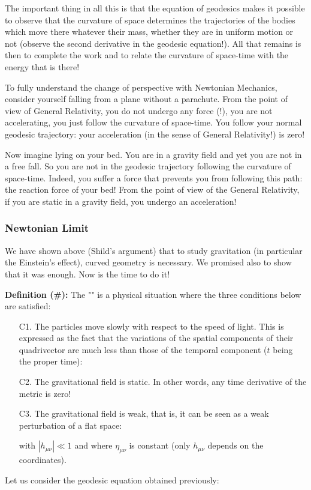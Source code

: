 	The important thing in all this is that the equation of geodesics makes it possible to observe that the curvature of space determines the trajectories of the bodies which move there whatever their mass, whether they are in uniform motion or not (observe the second derivative in the geodesic equation!). All that remains is then to complete the work and to relate the curvature of space-time with the energy that is there!
	
	To fully understand the change of perspective with Newtonian Mechanics, consider yourself falling from a plane without a parachute. From the point of view of General Relativity, you do not undergo any force (!), you are not accelerating, you just follow the curvature of space-time. You follow your normal geodesic trajectory: your acceleration (in the sense of General Relativity!) is zero!
	
	Now imagine lying on your bed. You are in a gravity field and yet you are not in a free fall. So you are not in the geodesic trajectory following the curvature of space-time. Indeed, you suffer a force that prevents you from following this path: the reaction force of your bed! From the point of view of the General Relativity, if you are static in a gravity field, you undergo an acceleration!
	
	\subsubsection{Newtonian Limit}\label{newtonian limit}
	We have shown above (Shild's argument) that to study gravitation (in particular the Einstein's effect), curved geometry is necessary. We promised also to show that it was enough. Now is the time to do it!

	\textbf{Definition (\#\mydef):}  The "" is a physical situation where the three conditions below are satisfied:
	\begin{enumerate}
		\item[C1.] The particles move slowly with respect to the speed of light. This is expressed as the fact that the variations of the spatial components of their quadrivector are much less than those of the temporal component ($t$ being the proper time):
		

		\item[C2.] The gravitational field is static. In other words, any time derivative of the metric is zero!

		\item[C3.] The gravitational field is weak, that is, it can be seen as a weak perturbation of a flat space:
		
		with $|h_{\mu\nu}|\ll 1$ and where $\eta_{\mu\nu}$ is constant (only $h_{\mu\nu}$ depends on the coordinates).
	\end{enumerate}
	Let us consider the geodesic equation obtained previously:
	

